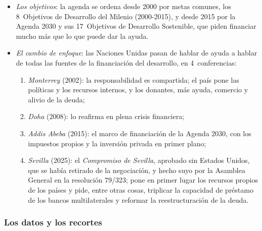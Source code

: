 \documentclass[11pt]{article}
\begin{document}
\begin{itemize}
\item \emph{Los objetivos}: la agenda se ordena desde 2000 por metas comunes, los 8~Objetivos de Desarrollo del Milenio (2000-2015), y desde 2015 por la Agenda 2030 y sus 17~Objetivos de Desarrollo Sostenible, que piden financiar mucho más que lo que puede dar la ayuda\nocite{ONU2015Agenda}.
\item \emph{El cambio de enfoque}: las Naciones Unidas pasan de hablar de ayuda a hablar de todas las fuentes de la financiación del desarrollo, en 4~conferencias:
  \begin{enumerate}
  \item \emph{Monterrey} (2002): la responsabilidad es compartida; el país pone las políticas y los recursos internos, y los donantes, más ayuda, comercio y alivio de la deuda;
  \item \emph{Doha} (2008): lo reafirma en plena crisis financiera;
  \item \emph{Addis Abeba} (2015): el marco de financiación de la Agenda 2030, con los impuestos propios y la inversión privada en primer plano;
  \item \emph{Sevilla} (2025): el \emph{Compromiso de Sevilla}, aprobado sin Estados Unidos, que se había retirado de la negociación, y hecho suyo por la Asamblea General en la resolución 79/323; pone en primer lugar los recursos propios de los países y pide, entre otras cosas, triplicar la capacidad de préstamo de los bancos multilaterales y reformar la reestructuración de la deuda\nocite{ONU2025Sevilla,ONU2025SevillaNoticia}.
  \end{enumerate}
\end{itemize}

\subsubsection{Los datos y los recortes}\label{sec:aod-datos}
\end{document}
